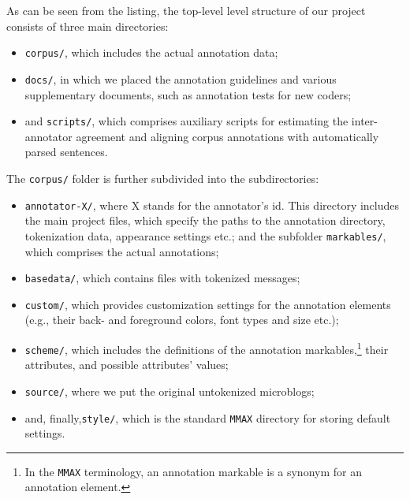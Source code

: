 As can be seen from the listing, the top-level level structure of our
project consists of three main directories:
  \begin{itemize}
  \item\texttt{corpus/}, which includes the actual annotation data;

  \item\texttt{docs/}, in which we placed the annotation guidelines and
    various supplementary documents, such as annotation tests for new
    coders;

  \item and \texttt{scripts/}, which comprises auxiliary scripts for
    estimating the inter-annotator agreement and aligning corpus
    annotations with automatically parsed sentences.
  \end{itemize}

{
  \setlength{\linewidth}{\textwidth}
  The \texttt{corpus/} folder is further subdivided into the
  subdirectories:
  \begin{itemize}
  \item\texttt{annotator-X/}, where X stands for the annotator's id.
    This directory includes the main project files, which specify the
    paths to the annotation directory, tokenization data, appearance
    settings etc.; and the subfolder \texttt{markables/}, which
    comprises the actual annotations;

  \item\texttt{basedata/}, which contains files with tokenized messages;

  \item\texttt{custom/}, which provides customization settings for the
    annotation elements (e.g., their back- and foreground colors, font
    types and size etc.);

  \item\texttt{scheme/}, which includes the definitions of the
    annotation markables,\footnote{In the \texttt{MMAX} terminology, an
      annotation markable is a synonym for an annotation element.}
    their attributes, and possible attributes' values;

  \item\texttt{source/}, where we put the original untokenized
    microblogs;

  \item and, finally,\texttt{style/}, which is the standard
    \texttt{MMAX} directory for storing default settings.
  \end{itemize}
}

